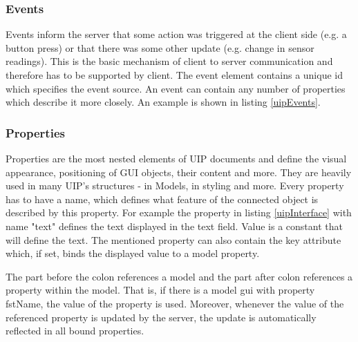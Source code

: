 \subsubsection{Events}
Events inform the server that some action was triggered at the client side (e.g. a button press) or that there was some other update (e.g. change in sensor readings). This is the basic mechanism of client to server communication and therefore has to be supported by client. The event element contains a unique id which specifies the event source. An event can contain any number of properties which describe it more closely. An example is shown in listing \ref{uipEvents}.


\subsubsection{Properties}
\label{subsec:props}
Properties are the most nested elements of UIP documents and define the visual appearance, positioning of GUI objects, their content and more. They are heavily used in many UIP's structures - in Models, in styling and more. Every property has to have a name, which defines what feature of the connected object is described by this property. For example the property in listing \ref{uipInterface} with name "text" defines the text displayed in the text field. Value is a constant that will define the text. The mentioned property can also contain the key attribute which, if set, binds the displayed value to a model property. 

The part before the colon references a model and the part after colon references a property within the model. That is, if there is a model gui with property fstName, the value of the property is used. Moreover, whenever the value of the referenced property is updated by the server, the update is automatically reflected in all bound properties.



